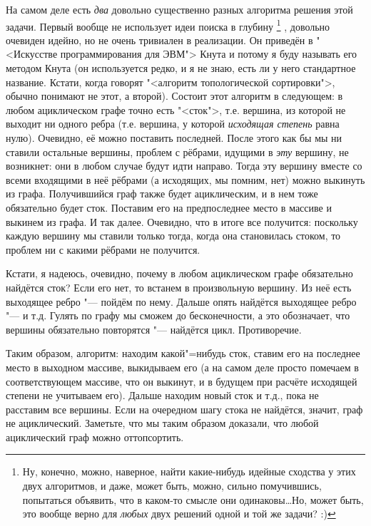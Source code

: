На самом деле есть \textit{два} довольно существенно разных алгоритма решения этой задачи. Первый 
вообще не использует идеи поиска в глубину%
\footnote{Ну, конечно, можно, наверное, найти какие-нибудь идейные сходства у этих двух алгоритмов, и даже, 
может быть, можно, сильно помучившись, попытаться объявить, что в каком-то смысле они 
одинаковы\dots Но, может быть, это вообще верно для \textit{любых} двух решений одной и той же 
задачи? :)}%
, довольно очевиден идейно, но не очень тривиален в 
реализации. Он приведён в "<Искусстве программирования для ЭВМ"> Кнута и потому я буду называть его 
методом Кнута (он используется редко, и я не знаю, есть ли у него стандартное название. Кстати, когда говорят
"<алгоритм топологической сортировки">, обычно понимают не этот, а второй). Состоит этот алгоритм в следующем: 
в любом ациклическом графе точно есть "<сток">, т.е. вершина, из которой не выходит ни одного ребра 
(т.е. вершина, у которой \textit{исходящая степень} равна нулю). Очевидно, её можно поставить 
последней. После этого как бы мы ни ставили остальные вершины,  проблем с рёбрами, идущими в 
\textit{эту} вершину, не возникнет: они в любом случае будут идти направо. Тогда эту вершину вместе 
со всеми входящими в неё рёбрами (а исходящих, мы помним, нет) можно выкинуть из графа. 
Получившийся граф также будет ациклическим, и в нем тоже обязательно будет сток. Поставим его на 
предпоследнее место в массиве и выкинем из графа. И так далее. Очевидно, что в итоге все получится: 
поскольку каждую вершину мы ставили только тогда, когда она становилась стоком, то проблем ни с 
какими рёбрами не получится.

Кстати, я надеюсь, очевидно, почему в любом ациклическом графе обязательно найдётся сток? Если его 
нет, то встанем в произвольную вершину. Из неё есть выходящее ребро "--- пойдём по нему. Дальше 
опять найдётся выходящее ребро "--- и т.д. Гулять по графу мы сможем до бесконечности, а это 
обозначает, что вершины обязательно повторятся "--- найдётся цикл. Противоречие.

Таким образом, алгоритм: находим какой"=нибудь сток, ставим его на последнее место в выходном 
массиве, выкидываем его (а на самом деле просто помечаем в соответствующем массиве, что он выкинут, и 
в будущем при расчёте исходящей степени не учитываем его). Дальше находим новый сток и т.д., пока 
не расставим все вершины. Если на очередном шагу стока не найдётся, значит, граф не ациклический.
Заметьте, что мы таким образом доказали, что любой ациклический граф можно оттопсортить.

